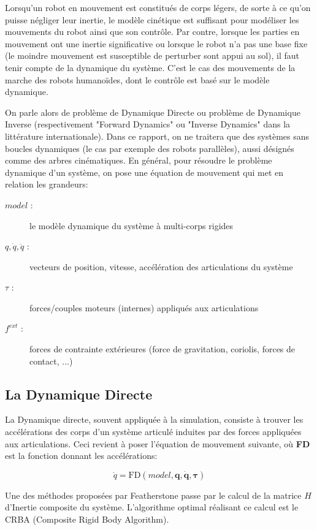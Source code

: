 \documentclass{report}
\begin{document}
Lorsqu'un robot en mouvement est constitués de corps légers, de sorte à ce qu'on puisse négliger leur inertie, le modèle cinétique est suffisant pour modéliser les mouvements du robot ainsi que son contrôle. Par contre, lorsque les parties en mouvement ont une inertie significative ou lorsque le robot n'a pas une base fixe (le moindre mouvement est susceptible de perturber sont appui au sol), il faut tenir compte de la dynamique du système. C'est le cas des mouvements de la marche des robots humanoïdes, dont le contrôle est basé sur le modèle dynamique.

On parle alors de problème de Dynamique Directe ou problème de Dynamique Inverse (respectivement "Forward Dynamics" ou "Inverse Dynamics" dans la littérature internationale). Dans ce rapport, on ne traitera que des systèmes sans boucles dynamiques (le cas par exemple des robots parallèles), aussi désignés comme des arbres cinématiques. En général, pour résoudre le problème dynamique d'un système, on pose une équation de mouvement qui met en relation les grandeurs:

\begin{description}
  \item[$model$ :] le modèle dynamique du système à multi-corps rigides
  \item[$q, \dot{q}, \ddot{q}$ :] vecteurs de position, vitesse, accélération des articulations du système
  \item[$\tau$ :] forces/couples moteurs (internes) appliqués aux articulations
  \item[$f^{ext}$ :] forces de contrainte extérieures (force de gravitation, coriolis, forces de contact, ...)
\end{description}

\subsection{La Dynamique Directe}

La Dynamique directe, souvent appliquée à la simulation, consiste à trouver les accélérations des corps d'un système articulé induites par des forces appliquées aux articulations. Ceci revient à poser l'équation de mouvement suivante, où \textbf{FD} est la fonction donnant les accélérations:

\begin{equation}
\ddot{q} = \mathrm{FD}(model,\mathbf{q,\dot{q},\tau})
\end{equation}

Une des méthodes proposées par Featherstone \cite[(6.2)]{bib_featherstone} passe par le calcul de la matrice $H$ d'Inertie composite du système.  L'algorithme optimal réalisant ce calcul est le CRBA (Composite Rigid Body Algorithm).
\end{document}
